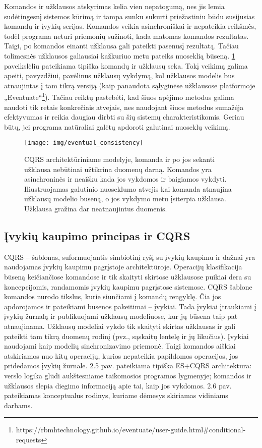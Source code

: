 Komandos ir užklausos atskyrimas kelia vien nepatogumą, nes jis lemia sudėtingesnį sistemos kūrimą ir tampa sunku sukurti priežastiniu būdu susijusias komandų ir įvykių serijas. Komandos veikia asinchroniškai ir nepateikia reikšmės, todėl programa neturi priemonių sužinoti, kada matomas komandos rezultatas. Taigi, po komandos einanti užklausa gali pateikti pasenusį rezultatą. Tačiau tolimesnės užklausos galiausiai kažkuriuo metu pateiks nuoseklią būseną. \ref{img:eventual_consistency} paveikslėliu pateikiama tipiška komandų ir užklausų seka. Tokį veikimą galima apeiti, pavyzdžiui, pavėlinus užklausų vykdymą, kol užklausos modelis bus atnaujintas į tam tikrą versiją (kaip panaudota sąlyginėse užklausose platformoje „Eventuate“\footnote{https://rbmhtechnology.github.io/eventuate/user-guide.html\#conditional-requests}). Tačiau reiktų pastebėti, kad šiuos apėjimo metodus galima naudoti tik retais konkrečiais atvejais, nes naudojant šiuos metodus sumažėja efektyvumas ir reikia daugiau dirbti su šių sistemų charakteristikomis. Geriau būtų, jei programa natūraliai galėtų apdoroti galutinai nuoseklų veikimą.

\begin{figure}[H]
    \centering
    \texttt{[image: img/eventual\_consistency]}
    \caption{CQRS architektūriniame modelyje, komanda ir po jos sekanti užklausa nebūtinai užtikrina duomenų darną. Komandos yra asinchroninės ir neaišku kada jos vykdomos ir baigiamos vykdyti. Iliustruojamas galutinio nuoseklumo atvejis kai komanda atnaujina užklausų modelio būseną, o jos vykdymo metu įsiterpia užklausa. Užklausa gražina dar neatnaujintus duomenis.}
    \label{img:eventual_consistency}
\end{figure}

\subsection{Įvykių kaupimo principas ir CQRS}

CQRS – šablonas, suformuojantis simbiotinį ryšį su įvykių kaupimu ir dažnai yra naudojamas įvykių kaupimu pagrįstoje architektūroje. Operacijų klasifikacija būseną keičiančiose komandose ir tik skaityti skirtose užklausose puikiai dera su koncepcijomis, randamomis įvykių kaupimu pagrįstose sistemose. CQRS šablone komandos nurodo tikslus, kurie siunčiami į komandų rengyklę. Čia jos apdorojamos ir pateikiami būsenos pakeitimai – įvykiai. Tada įvykiai įtraukiami į įvykių žurnalą ir publikuojami užklausų modeliuose, kur jų būsena taip pat atnaujinama. Užklausų modeliai vykdo tik skaityti skirtas užklausas ir gali pateikti tam tikrą duomenų rodinį (pvz., sąskaitų lentelę ir jų likučius). Įvykiai naudojami kaip modelių sinchronizavimo priemonė. Taigi komandos aiškiai atskiriamos nuo kitų operacijų, kurios nepateikia papildomos operacijos, jos pridedamos įvykių žurnale. 2.5 pav. pateikiama tipiška ES+CQRS architektūra: verslo logika glūdi aukštesniame taikomosios programos lygmenyje; komandos ir užklausos slepia diegimo informaciją apie tai, kaip jos vykdomos. 2.6 pav. pateikiamas konceptualus rodinys, kuriame dėmesys skiriamas vidiniams darbams.

